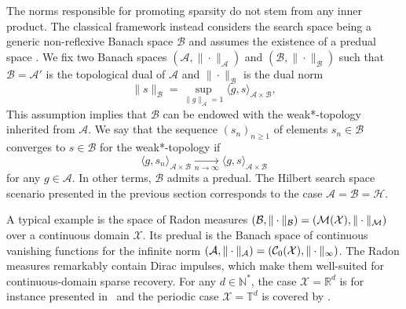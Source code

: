 \documentclass[12pt]{article}
\begin{document}
    The norms responsible for promoting sparsity do not stem from any inner product. The classical framework instead considers the search space being a generic non-reflexive Banach space $\mathcal{B}$ and assumes the existence of a predual space \cite{unser2021unifying}.
    We fix two Banach spaces $( \mathcal{A}, \| \cdot \|_{\mathcal{A}})$ and $( \mathcal{B}, \| \cdot \|_{\mathcal{B}})$ such that $\mathcal{B} = \mathcal{A}'$ is the topological dual of $\mathcal{A}$ and $\| \cdot \|_{\mathcal{B}}$ is the dual norm 
    \begin{equation*}
        \| s \|_{\mathcal{B}} = \sup_{\|g \|_{\mathcal{A}}=1} \langle g, s \rangle_{\mathcal{A}\times\mathcal{B}}, 
    \end{equation*}
    This assumption implies that $\mathcal{B}$ can be endowed with the weak*-topology inherited from $\mathcal{A}$. We say that the sequence $(s_n)_{n\geq 1}$ of elements $s_n \in \mathcal{B}$ converges to $s \in \mathcal{B}$ for the weak*-topology if 
    \begin{equation*}
        \langle g , s_n \rangle_{\mathcal{A}\times\mathcal{B}} \underset{n\rightarrow \infty}{\longrightarrow} \langle g, s \rangle_{\mathcal{A}\times\mathcal{B}} 
    \end{equation*}
    for any $g \in \mathcal{A}$.
    In other terms, $\mathcal{B}$ admits a predual. The Hilbert search space scenario presented in the previous section corresponds to the case $\mathcal{A} = \mathcal{B} = \mathcal{H}$.

    A typical example is the space of Radon measures $(\mathcal{B}, \|\cdot \|_{\mathcal{B}}) = ({\mathcal{M}}({\mathcal{X}}), \|\cdot \|_{\mathcal{M}})$ over a continuous domain $\mathcal{X}$. Its predual is the Banach space of continuous vanishing functions for the infinite norm $(\mathcal{A}, \|\cdot \|_{\mathcal{A}}) =({\mathcal{C}}_0({\mathcal{X}}), \| \cdot \|_{\infty})$. The Radon measures remarkably contain Dirac impulses, which make them well-suited for continuous-domain sparse recovery. For any $d\in\mathbb{N}^*$, the case $\mathcal{X}=\mathbb{R}^d$ is for instance presented in~\cite{unser2017splines,Unser2020} and the periodic case $\mathcal{X}=\mathbb{T}^d$ is covered by \cite{fageot2020tv}.
\end{document}

